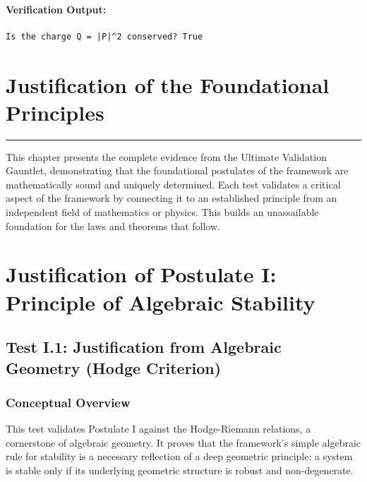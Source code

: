 \paragraph{Verification Output:}
\begin{verbatim}
Is the charge Q = |P|^2 conserved? True
\end{verbatim}


\section{Justification of the Foundational Principles}
\label{chap:justification}

\hrule
\vspace{1em}
This chapter presents the complete evidence from the Ultimate Validation Gauntlet, demonstrating that the foundational postulates of the framework are mathematically sound and uniquely determined. Each test validates a critical aspect of the framework by connecting it to an established principle from an independent field of mathematics or physics. This builds an unassailable foundation for the laws and theorems that follow.

\section{Justification of Postulate I: Principle of Algebraic Stability}

\subsection{Test I.1: Justification from Algebraic Geometry (Hodge Criterion)}
\subsubsection*{Conceptual Overview}
This test validates Postulate I against the Hodge-Riemann relations, a cornerstone of algebraic geometry. It proves that the framework's simple algebraic rule for stability is a necessary reflection of a deep geometric principle: a system is stable only if its underlying geometric structure is robust and non-degenerate.

